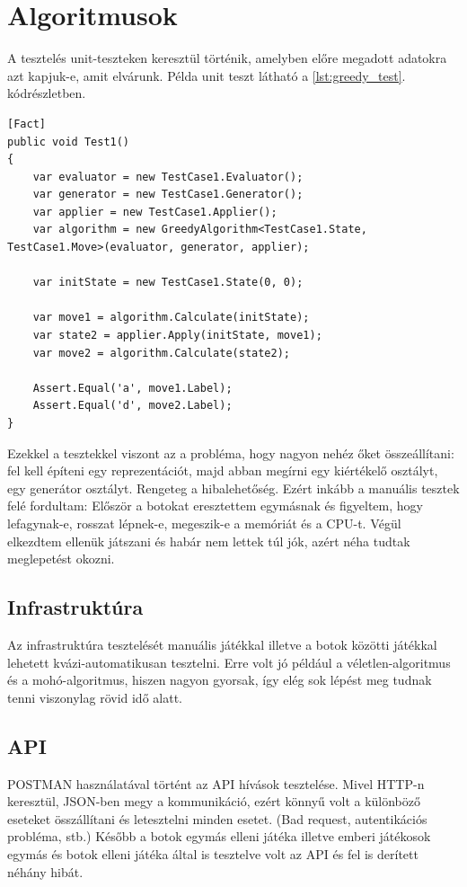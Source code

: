 \documentclass[twoside, a4paper, 12pt]{book}
\begin{document}
\section{Algoritmusok}
A tesztelés unit-teszteken keresztül történik, amelyben előre megadott adatokra azt kapjuk-e, amit elvárunk. Példa unit teszt látható a \ref{lst:greedy_test}. kódrészletben.

\begin{lstlisting}[caption=Mohó-algoritmus teszt, label=lst:greedy_test, float]
[Fact]
public void Test1()
{
	var evaluator = new TestCase1.Evaluator();
	var generator = new TestCase1.Generator();
	var applier = new TestCase1.Applier();
	var algorithm = new GreedyAlgorithm<TestCase1.State, TestCase1.Move>(evaluator, generator, applier);
	
	var initState = new TestCase1.State(0, 0);
	
	var move1 = algorithm.Calculate(initState);
	var state2 = applier.Apply(initState, move1);
	var move2 = algorithm.Calculate(state2);
	
	Assert.Equal('a', move1.Label);
	Assert.Equal('d', move2.Label);
}
\end{lstlisting}

Ezekkel a tesztekkel viszont az a probléma, hogy nagyon nehéz őket összeállítani: fel kell építeni egy reprezentációt, majd abban megírni egy kiértékelő osztályt, egy generátor osztályt. Rengeteg a hibalehetőség. Ezért inkább a manuális tesztek felé fordultam:
Először a botokat eresztettem egymásnak és figyeltem, hogy lefagynak-e, rosszat lépnek-e, megeszik-e a memóriát és a CPU-t. Végül elkezdtem ellenük játszani és habár nem lettek túl jók, azért néha tudtak meglepetést okozni.



\subsection{Infrastruktúra}
Az infrastruktúra tesztelését manuális játékkal illetve a botok közötti játékkal lehetett kvázi-automatikusan tesztelni. Erre volt jó például a véletlen-algoritmus és a mohó-algoritmus, hiszen nagyon gyorsak, így elég sok lépést meg tudnak tenni viszonylag rövid idő alatt.


\subsection{API}
POSTMAN használatával történt az API hívások tesztelése. Mivel HTTP-n keresztül, JSON-ben megy a kommunikáció, ezért könnyű volt a különböző eseteket összállítani és letesztelni minden esetet. (Bad request, autentikációs probléma, stb.) Később a botok egymás elleni játéka illetve emberi játékosok egymás és botok elleni játéka által is tesztelve volt az API és fel is derített néhány hibát.
\end{document}
